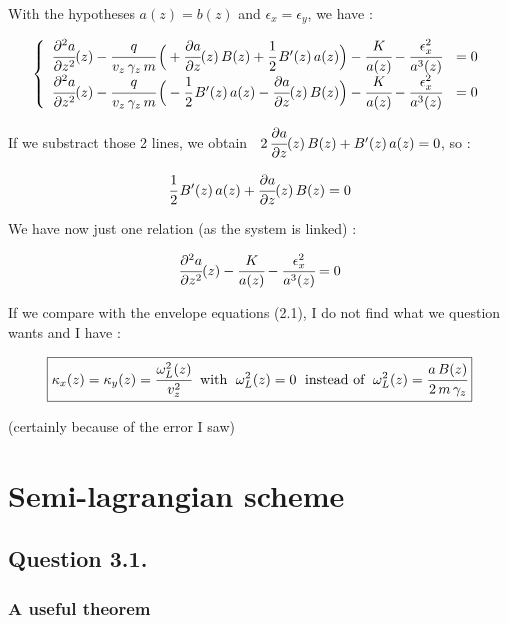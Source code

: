 \documentclass[10pt]{article}
\newcommand{\D}{{\partial}}
\begin{document}
With the hypotheses $a(z) = b(z)$ and $\epsilon_{x} = \epsilon_{y}$, we have :

$$
\left\lbrace
    \begin{array}{ll}
\cfrac{\D^2 a}{\D z^2}(z) - \cfrac{q}{v_{z}\,\gamma_{z}\,m}\,\Big( +\cfrac{\D a}{\D z}(z)\,B(z) + \cfrac{1}{2}\,B'(z)\,a(z)\Big) -  \cfrac{K}{a(z)} - \cfrac{\epsilon_{x}^2}{a^3(z)} &= 0 \\
\cfrac{\D^2 a}{\D z^2}(z) - \cfrac{q}{v_{z}\,\gamma_{z}\,m}\,\Big( -\cfrac{1}{2}\,B'(z)\,a(z) - \cfrac{\D a}{\D z}(z)\,B(z)\Big) - \cfrac{K}{a(z)} - \cfrac{\epsilon_{x}^2}{a^3(z)} &= 0 
    \end{array}
\right.
$$

If we substract those 2 lines, we obtain $\;\; 2\,\cfrac{\D a}{\D z}(z)\,B(z) + B'(z)\,a(z) = 0$, so :

$$\cfrac{1}{2}\,B'(z)\,a(z) + \cfrac{\D a}{\D z}(z)\,B(z) = 0$$

We have now just one relation (as the system is linked) :

$$
\cfrac{\D^2 a}{\D z^2}(z)  -  \cfrac{K}{a(z)} - \cfrac{\epsilon_{x}^2}{a^3(z)} = 0
$$

If we compare with the envelope equations (2.1), I do not find what we question wants and I have :

$$\boxed{\kappa_{x}(z) = \kappa_{y}(z) = \cfrac{\omega_{L}^{2}(z)}{v_z^2} \; \mbox{ with } \; \omega_{L}^{2}(z) = 0 \; \mbox{ instead of } \; \omega_{L}^{2}(z) = \cfrac{a\,B(z)}{2\,m\,\gamma_{z}}}$$

(certainly because of the error I saw)




\newpage

\section{Semi-lagrangian scheme}


\subsection{Question 3.1.}


\subsubsection{A useful theorem}
\end{document}
